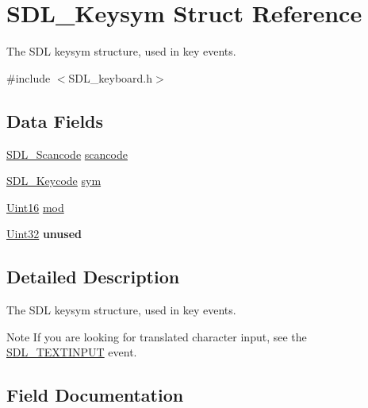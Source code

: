 \hypertarget{struct_s_d_l___keysym}{}\section{S\+D\+L\+\_\+\+Keysym Struct Reference}
\label{struct_s_d_l___keysym}


The S\+DL keysym structure, used in key events.  




{\ttfamily \#include $<$S\+D\+L\+\_\+keyboard.\+h$>$}

\subsection*{Data Fields}
\begin{DoxyCompactItemize}
\item 
\hyperlink{_s_d_l__scancode_8h_a82ab7cff701034fb40a47b5b3a02777b}{S\+D\+L\+\_\+\+Scancode} \hyperlink{struct_s_d_l___keysym_a9c8d3b45ebf0a9f0673325d40755c066}{scancode}
\item 
\hyperlink{_s_d_l__keycode_8h_ae9265f064f13f0f74dfca26a67875171}{S\+D\+L\+\_\+\+Keycode} \hyperlink{struct_s_d_l___keysym_a20cf23ed00a5cd751fa49ad19e93305a}{sym}
\item 
\hyperlink{_s_d_l__stdinc_8h_a31fcc0a076c9068668173ee26d33e42b}{Uint16} \hyperlink{struct_s_d_l___keysym_a09294cbc86473d2bcb27513748b81aec}{mod}
\item 
\hyperlink{_s_d_l__stdinc_8h_add440eff171ea5f55cb00c4a9ab8672d}{Uint32} {\bfseries unused}\hypertarget{struct_s_d_l___keysym_acdefb820f1317fee3507aa00d3d77468}{}\label{struct_s_d_l___keysym_acdefb820f1317fee3507aa00d3d77468}

\end{DoxyCompactItemize}


\subsection{Detailed Description}
The S\+DL keysym structure, used in key events. 

\begin{DoxyNote}{Note}
If you are looking for translated character input, see the \hyperlink{_s_d_l__events_8h_a3b589e89be6b35c02e0dd34a55f3fccaa4fa2570088f6b9cbd109ae91b511368f}{S\+D\+L\+\_\+\+T\+E\+X\+T\+I\+N\+P\+UT} event. 
\end{DoxyNote}


\subsection{Field Documentation}
